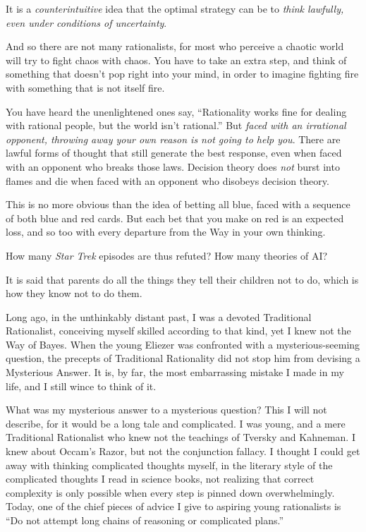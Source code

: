 {
 It is a \textit{counterintuitive} idea that the optimal strategy
can be to \textit{think lawfully, even under conditions of
uncertainty}.}

{
 And so there are not many rationalists, for most who perceive a
chaotic world will try to fight chaos with chaos. You have to take an
extra step, and think of something that doesn't pop
right into your mind, in order to imagine fighting fire with something
that is not itself fire.}

{
 You have heard the unenlightened ones say,
``Rationality works fine for dealing with rational
people, but the world isn't
rational.'' But \textit{faced with an irrational
opponent, throwing away your own reason is not going to help you}.
There are lawful forms of thought that still generate the best
response, even when faced with an opponent who breaks those laws.
Decision theory does \textit{not} burst into flames and die when faced
with an opponent who disobeys decision theory.}

{
 This is no more obvious than the idea of betting all blue, faced
with a sequence of both blue and red cards. But each bet that you make
on red is an expected loss, and so too with every departure from the
Way in your own thinking.}

{
 How many \textit{Star Trek} episodes are thus refuted? How many
theories of AI?}

\myendsectiontext


\bigskip


{
 It is said that parents do all the things they tell their children
not to do, which is how they know not to do them. }

{
 Long ago, in the unthinkably distant past, I was a devoted
Traditional Rationalist, conceiving myself skilled according to that
kind, yet I knew not the Way of Bayes. When the young Eliezer was
confronted with a mysterious-seeming question, the precepts of
Traditional Rationality did not stop him from devising a Mysterious
Answer. It is, by far, the most embarrassing mistake I made in my life,
and I still wince to think of it.}

{
 What was my mysterious answer to a mysterious question? This I
will not describe, for it would be a long tale and complicated. I was
young, and a mere Traditional Rationalist who knew not the teachings of
Tversky and Kahneman. I knew about Occam's Razor, but
not the conjunction fallacy. I thought I could get away with thinking
complicated thoughts myself, in the literary style of the complicated
thoughts I read in science books, not realizing that correct complexity
is only possible when every step is pinned down overwhelmingly. Today,
one of the chief pieces of advice I give to aspiring young rationalists
is ``Do not attempt long chains of reasoning or
complicated plans.''}

